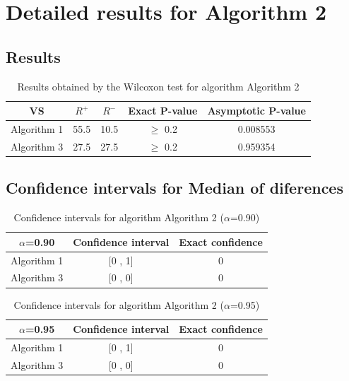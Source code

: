 \documentclass[a4paper,10pt]{article}
\begin{document}
 \clearpage 


\section{Detailed results for Algorithm 2}


\subsection{Results}

\begin{table}[!htp]
\centering\small
\begin{tabular}{
|c|c|c|c|c|}
\hline
 VS & $R^{+}$ & $R^{-}$ & Exact P-value & Asymptotic P-value \\ \hline 
Algorithm 1 & 55.5 & 10.5 & $\geq$ 0.2 & 0.008553\\ \hline 
Algorithm 3 & 27.5 & 27.5 & $\geq$ 0.2 & 0.959354\\ \hline 

\end{tabular}
\caption{Results obtained by the Wilcoxon test for algorithm Algorithm 2}
\end{table}

\subsection{Confidence intervals for Median of diferences}

\begin{table}[!htp]
\centering\small
\begin{tabular}{
|c|c|c|}
\hline
 $\alpha$=0.90 & Confidence interval & Exact confidence \\ \hline 
Algorithm 1 & [0 , 1] & 0\\ \hline 
Algorithm 3 & [0 , 0] & 0\\ \hline 

\end{tabular}
\caption{Confidence intervals for algorithm Algorithm 2 ($\alpha$=0.90)}
\end{table}
\begin{table}[!htp]
\centering\small
\begin{tabular}{
|c|c|c|}
\hline
 $\alpha$=0.95 & Confidence interval & Exact confidence \\ \hline 
Algorithm 1 & [0 , 1] & 0\\ \hline 
Algorithm 3 & [0 , 0] & 0\\ \hline 

\end{tabular}
\caption{Confidence intervals for algorithm Algorithm 2 ($\alpha$=0.95)}
\end{table}
\end{document}
